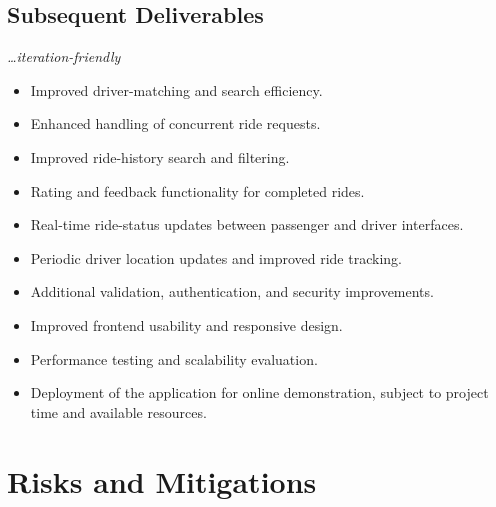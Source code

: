 \documentclass[11pt,a4paper]{article}
\newcommand{\BvrHint}[1]{%
  {\normalfont\normalsize\itshape\hfill #1}}
\begin{document}
\subsection{Subsequent Deliverables}
\BvrHint{\ldots iteration-friendly}

\begin{itemize}

    \item Improved driver-matching and search efficiency.

    \item Enhanced handling of concurrent ride requests.

    \item Improved ride-history search and filtering.

    \item Rating and feedback functionality for completed rides.

    \item Real-time ride-status updates between passenger and driver
    interfaces.

    \item Periodic driver location updates and improved ride tracking.

    \item Additional validation, authentication, and security
    improvements.

    \item Improved frontend usability and responsive design.

    \item Performance testing and scalability evaluation.

    \item Deployment of the application for online demonstration,
    subject to project time and available resources.

\end{itemize}


\section{Risks and Mitigations}
\end{document}
